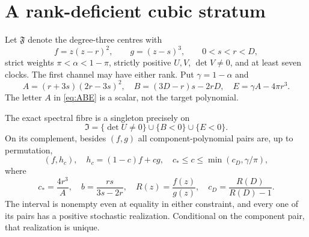 \section{A rank-deficient cubic stratum}\label{sec:cubic}
Let $\mathfrak F$ denote the degree-three centres with
\[
 f=z(z-r)^2,\qquad g=(z-s)^3,\qquad 0<s<r<D,
\]
strict weights $\pi<\alpha<1-\pi$, strictly positive $U,V$, $\det V\ne0$,
and at least seven clocks. The first channel may have either rank. Put
$\gamma=1-\alpha$ and
\begin{equation}\label{eq:ABE}
 A=(r+3s)(2r-3s)^2,\quad B=(3D-r)s-2rD,\quad E=\gamma A-4\pi r^3.
\end{equation}
The letter $A$ in \eqref{eq:ABE} is a scalar, not the target polynomial.

\begin{theorem}\label{thm:cubic-fibre}
The exact spectral fibre is a singleton precisely on
\begin{equation}\label{eq:I}
 \mathfrak I=\{\det U\ne0\}\cup\{B<0\}\cup\{E<0\}.
\end{equation}
On its complement, besides $(f,g)$ all component-polynomial pairs are,
up to permutation,
\begin{equation}\label{eq:remote-interval}
 (f,h_c),\quad h_c=(1-c)f+cg,\quad
 c_*\le c\le\min(c_D,\gamma/\pi),
\end{equation}
where
\[
 c_*=\frac{4r^3}{A},\quad b=\frac{rs}{3s-2r},\quad
 R(z)=\frac{f(z)}{g(z)},\quad c_D=\frac{R(D)}{R(D)-1}.
\]
The interval is nonempty even at equality in either constraint, and
every one of its pairs has a positive stochastic realization. Conditional
on the component pair, that realization is unique.
\end{theorem}
